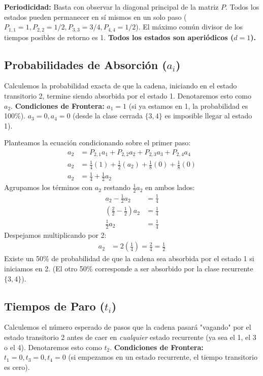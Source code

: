 \documentclass[12pt, a4paper]{article}
\begin{document}
\textbf{Periodicidad:}
Basta con observar la diagonal principal de la matriz $P$. Todos los estados pueden permanecer en sí mismos en un solo paso ($P_{1,1}=1, P_{2,2}=1/2, P_{3,3}=3/4, P_{4,4}=1/2$). El máximo común divisor de los tiempos posibles de retorno es 1. \textbf{Todos los estados son aperiódicos ($d=1$).}

\subsection{Probabilidades de Absorción ($a_i$)}
Calculemos la probabilidad exacta de que la cadena, iniciando en el estado transitorio 2, termine siendo absorbida por el estado 1. Denotaremos esto como $a_2$.
\textbf{Condiciones de Frontera:} $a_1 = 1$ (si ya estamos en 1, la probabilidad es 100\%). $a_3 = 0, a_4 = 0$ (desde la clase cerrada $\{3,4\}$ es imposible llegar al estado 1).

Planteamos la ecuación condicionando sobre el primer paso:
\begin{align}
    a_2 &= P_{2,1}a_1 + P_{2,2}a_2 + P_{2,3}a_3 + P_{2,4}a_4 \\
    a_2 &= \frac{1}{4}(1) + \frac{1}{2}(a_2) + \frac{1}{8}(0) + \frac{1}{8}(0) \\
    a_2 &= \frac{1}{4} + \frac{1}{2}a_2
\end{align}
Agrupamos los términos con $a_2$ restando $\frac{1}{2}a_2$ en ambos lados:
\begin{align*}
    a_2 - \frac{1}{2}a_2 &= \frac{1}{4} \\
    \left(\frac{2}{2} - \frac{1}{2}\right) a_2 &= \frac{1}{4} \\
    \frac{1}{2}a_2 &= \frac{1}{4}
\end{align*}
Despejamos multiplicando por 2:
\begin{align*}
    a_2 &= 2 \left(\frac{1}{4}\right) = \frac{2}{4} = \frac{1}{2}
\end{align*}
Existe un 50\% de probabilidad de que la cadena sea absorbida por el estado 1 si iniciamos en 2. (El otro 50\% corresponde a ser absorbido por la clase recurrente $\{3,4\}$).

\subsection{Tiempos de Paro ($t_i$)}
Calculemos el número esperado de pasos que la cadena pasará "vagando" por el estado transitorio 2 antes de caer en \textit{cualquier} estado recurrente (ya sea el 1, el 3 o el 4). Denotaremos esto como $t_2$.
\textbf{Condiciones de Frontera:} $t_1 = 0, t_3 = 0, t_4 = 0$ (si empezamos en un estado recurrente, el tiempo transitorio es cero).
\end{document}
